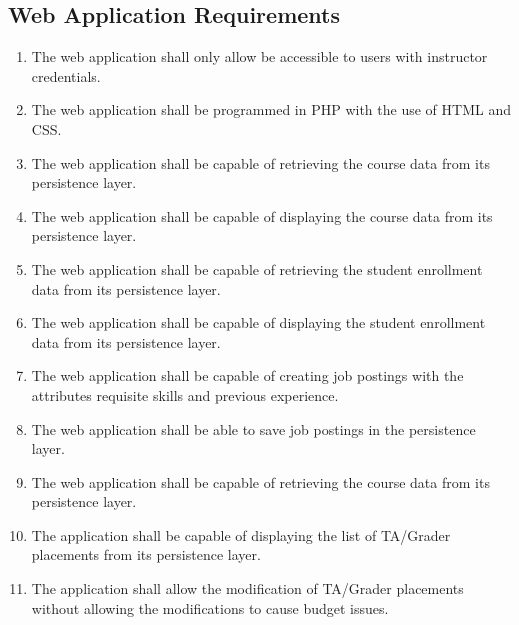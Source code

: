 \documentclass[12pt,openany]{report}
\begin{document}
\subsection{Web Application Requirements}
\begin{enumerate}[\thesubsection .1]
	\item The web application shall only allow be accessible to users with instructor credentials.
	\item The web application shall be programmed in PHP with the use of HTML and CSS.
	\item The web application shall be capable of retrieving the course data from its persistence layer.
	\item The web application shall be capable of displaying the course data from its persistence layer.
	\item The web application shall be capable of retrieving the student enrollment data from its persistence layer.
	\item The web application shall be capable of displaying the student enrollment data from its persistence layer.
	\item The web application shall be capable of creating job postings with the attributes requisite skills and previous experience.
	\item The web application shall be able to save job postings in the persistence layer.
	\item The web application shall be capable of retrieving the course data from its persistence layer.
	\item The application shall be capable of displaying the list of TA/Grader placements from its persistence layer.
	\item The application shall allow the modification of TA/Grader placements without allowing the modifications to cause budget issues.
\end{enumerate}
\end{document}
